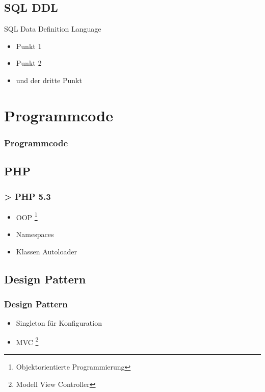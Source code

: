 \documentclass[xcolor=dvipsnames]{beamer}
\begin{document}
\subsection{SQL DDL}
\begin{frame} %
\begin{block}{SQL Data Definition Language}		
	\begin{itemize}[]
		\item Punkt 1
		\item Punkt 2
		\item und der dritte Punkt
	\end{itemize}
\end{block}

\end{frame}

\section{Programmcode}
\begin{frame}[shrink] %
  \frametitle{Programmcode} %

\end{frame}

\subsection{PHP}
\begin{frame} %
  \frametitle{> PHP 5.3} %
  \begin{block}{}
	  \begin{itemize}
  		\item OOP \footnote{Objektorientierte Programmierung}
		\item Namespaces
  		\item Klassen Autoloader
	  \end{itemize}
  \end{block} 
\end{frame}

\subsection{Design Pattern}
\begin{frame} %
  \frametitle{Design Pattern} %
  \begin{block}{}
	  \begin{itemize}
  		\item Singleton für Konfiguration
  		\item MVC \footnote{Modell View Controller}
	  \end{itemize}
  \end{block} 
\end{frame}
\end{document}
